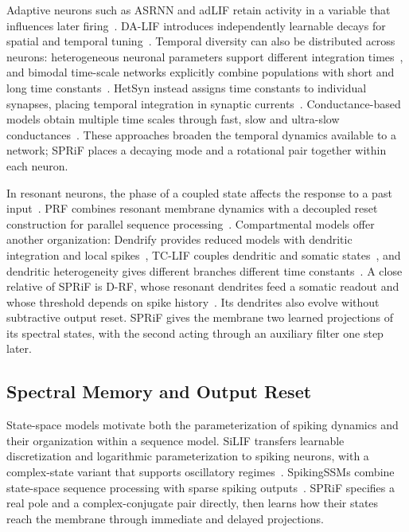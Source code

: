 \documentclass[letterpaper,journal]{IEEEtran}
\begin{document}
Adaptive neurons such as ASRNN and adLIF retain activity in a variable that influences later firing~\cite{asrnn,adlif}. DA-LIF introduces independently learnable decays for spatial and temporal tuning~\cite{dalif}. Temporal diversity can also be distributed across neurons: heterogeneous neuronal parameters support different integration times~\cite{heterogeneity}, and bimodal time-scale networks explicitly combine populations with short and long time constants~\cite{bimodal}. HetSyn instead assigns time constants to individual synapses, placing temporal integration in synaptic currents~\cite{hetsyn}. Conductance-based models obtain multiple time scales through fast, slow and ultra-slow conductances~\cite{mtc}. These approaches broaden the temporal dynamics available to a network; SPRiF places a decaying mode and a rotational pair together within each neuron.

In resonant neurons, the phase of a coupled state affects the response to a past input~\cite{izhikevich_rf,brf}. PRF combines resonant membrane dynamics with a decoupled reset construction for parallel sequence processing~\cite{prf}. Compartmental models offer another organization: Dendrify provides reduced models with dendritic integration and local spikes~\cite{dendrify}, TC-LIF couples dendritic and somatic states~\cite{tclif}, and dendritic heterogeneity gives different branches different time constants~\cite{dhsnn}. A close relative of SPRiF is D-RF, whose resonant dendrites feed a somatic readout and whose threshold depends on spike history~\cite{drf}. Its dendrites also evolve without subtractive output reset. SPRiF gives the membrane two learned projections of its spectral states, with the second acting through an auxiliary filter one step later.

\subsection{Spectral Memory and Output Reset}

State-space models motivate both the parameterization of spiking dynamics and their organization within a sequence model. SiLIF transfers learnable discretization and logarithmic parameterization to spiking neurons, with a complex-state variant that supports oscillatory regimes~\cite{silif}. SpikingSSMs combine state-space sequence processing with sparse spiking outputs~\cite{spikingssms}. SPRiF specifies a real pole and a complex-conjugate pair directly, then learns how their states reach the membrane through immediate and delayed projections.
\end{document}
